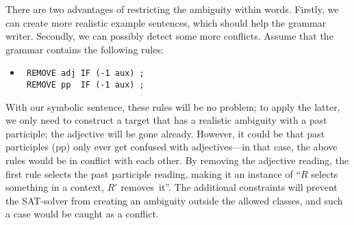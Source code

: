 There are two advantages of restricting the ambiguity within words.
Firstly, we can create more realistic example sentences, which should help the grammar writer.
Secondly, we can possibly detect some more conflicts. Assume that the grammar contains the following rules:

 \begin{itemize}
 \item[] 
\begin{verbatim}
 REMOVE adj IF (-1 aux) ;
 REMOVE pp  IF (-1 aux) ;
 \end{verbatim}
 \end{itemize}

 With our symbolic sentence, these rules will be no problem; to apply the latter, we only need to construct a target that has a realistic ambiguity with a past participle; the adjective will be gone already.
However, it could be that past participles (pp) only ever get confused with adjectives---in that case, the above rules would be in conflict with each other.
 By removing the adjective reading, the first rule selects the past participle reading, making it an instance of ``$R$ selects something in a context, $R'$ removes~it''. 
The additional constraints will prevent the SAT-solver from creating an ambiguity outside the allowed classes, and such a case would be caught as a conflict.





